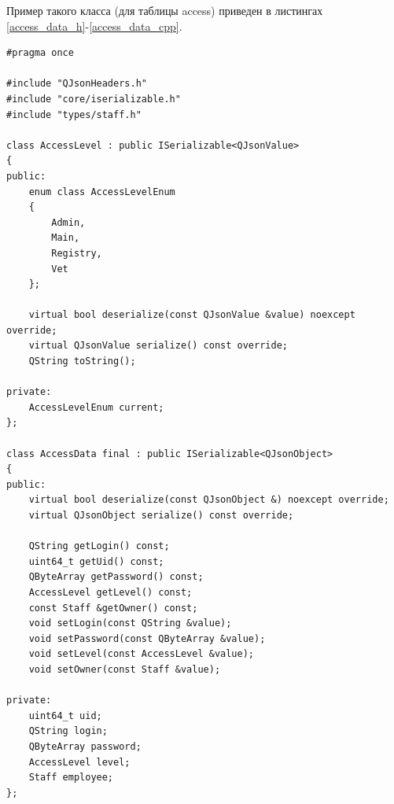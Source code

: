 \documentclass[a4paper,14pt]{article}
\begin{document}
Пример такого класса (для таблицы access) приведен в листингах \ref{access_data_h}-\ref{access_data_cpp}.

\begin{lstlisting}[label=access_data_h,caption=\text{access\_data.h.}]
	#pragma once

#include "QJsonHeaders.h"
#include "core/iserializable.h"
#include "types/staff.h"

class AccessLevel : public ISerializable<QJsonValue>
{
public:
	enum class AccessLevelEnum
	{
		Admin,
		Main,
		Registry,
		Vet
	};

	virtual bool deserialize(const QJsonValue &value) noexcept override;
	virtual QJsonValue serialize() const override;
	QString toString();

private:
	AccessLevelEnum current;
};

class AccessData final : public ISerializable<QJsonObject>
{
public:
	virtual bool deserialize(const QJsonObject &) noexcept override;
	virtual QJsonObject serialize() const override;

	QString getLogin() const;
	uint64_t getUid() const;
	QByteArray getPassword() const;
	AccessLevel getLevel() const;
	const Staff &getOwner() const;
	void setLogin(const QString &value);
	void setPassword(const QByteArray &value);
	void setLevel(const AccessLevel &value);
	void setOwner(const Staff &value);

private:
	uint64_t uid;
	QString login;
	QByteArray password;
	AccessLevel level;
	Staff employee;
};
\end{lstlisting}
\end{document}
